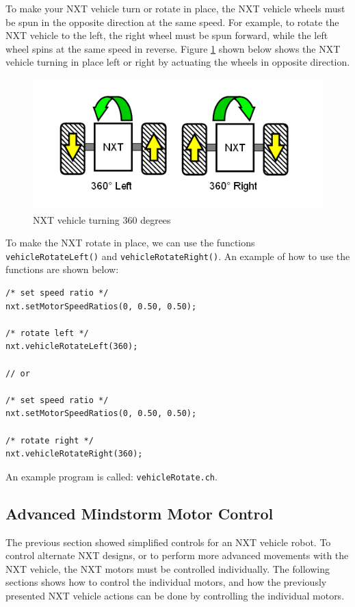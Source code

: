 \documentclass[11pt]{article}
\begin{document}
To make your NXT vehicle turn or rotate in place, the NXT vehicle wheels must 
be spun in the opposite direction at the same speed. For example, to rotate the 
NXT vehicle to the left, the right wheel must be spun forward, while the left 
wheel spins at the same speed in reverse. Figure \ref{fig_NXT_360LR} shown below 
shows the NXT vehicle turning in place left or right by actuating the wheels in 
opposite direction.
\begin{figure}[H]
  \begin{center}
    \includegraphics[height=2in]{figure/mindstorm/Vehicle_360LR.png}
    \caption{NXT vehicle turning 360 degrees \label{fig_NXT_360LR}}
  \end{center}
\end{figure}
To make the NXT rotate in place, we can use the functions {\tt vehicleRotateLeft()} 
and {\tt vehicleRota}{\tt teRight()}. An example of how to use the functions are shown 
below:
\begin{lstlisting}
/* set speed ratio */
nxt.setMotorSpeedRatios(0, 0.50, 0.50);
    
/* rotate left */
nxt.vehicleRotateLeft(360);

// or
    
/* set speed ratio */
nxt.setMotorSpeedRatios(0, 0.50, 0.50);

/* rotate right */
nxt.vehicleRotateRight(360);
\end{lstlisting}
An example program is called: {\tt vehicleRotate.ch}.

\subsection{Advanced Mindstorm Motor Control}
The previous section showed simplified controls for an NXT vehicle robot. To 
control alternate NXT designs, or to perform more advanced movements with the 
NXT vehicle, the NXT motors must be controlled individually. The following 
sections shows how to control the individual motors, and how the previously 
presented NXT vehicle actions can be done by controlling the individual motors.
\end{document}

